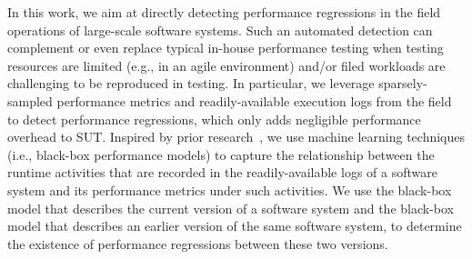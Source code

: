 

In this work, we aim at directly detecting performance regressions in the field operations of large-scale software systems.
Such an automated detection can complement or even replace typical in-house performance testing when testing resources are limited (e.g., in an agile environment) and/or filed workloads are challenging to be reproduced in testing.
In particular, we leverage sparsely-sampled performance metrics and readily-available execution logs from the field to detect performance regressions, which only adds negligible performance overhead to SUT.
Inspired by prior research~\citep{Yao:2018:LSL:3184407.3184416,DBLP:conf/issre/FarshchiSWG15}, we use machine learning techniques (i.e., black-box performance models) to capture the relationship between the runtime activities that are recorded in the readily-available logs of a software system and its performance metrics under such activities. 
We use the black-box model that describes the current version of a software system and the black-box model that describes an earlier version of the same software system, to determine the existence of performance regressions between these two versions.

